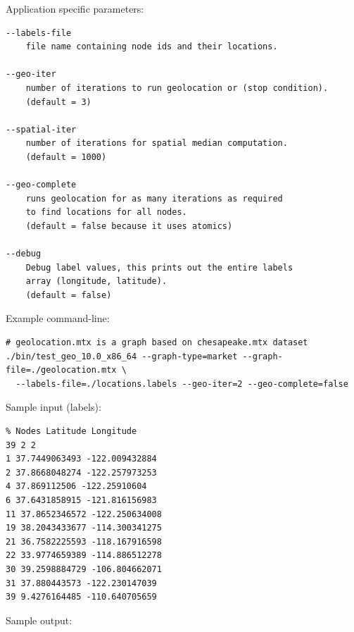 \documentclass[10pt,oneside]{memoir}
\begin{document}
Application specific parameters:

\begin{verbatim}
--labels-file
    file name containing node ids and their locations.

--geo-iter
    number of iterations to run geolocation or (stop condition).
    (default = 3)

--spatial-iter
    number of iterations for spatial median computation.
    (default = 1000)

--geo-complete
    runs geolocation for as many iterations as required
    to find locations for all nodes.
    (default = false because it uses atomics)

--debug
    Debug label values, this prints out the entire labels
    array (longitude, latitude).
    (default = false)
\end{verbatim}

Example command-line:

\begin{verbatim}
# geolocation.mtx is a graph based on chesapeake.mtx dataset
./bin/test_geo_10.0_x86_64 --graph-type=market --graph-file=./geolocation.mtx \
  --labels-file=./locations.labels --geo-iter=2 --geo-complete=false
\end{verbatim}

Sample input (labels):

\begin{verbatim}
% Nodes Latitude Longitude
39 2 2
1 37.7449063493 -122.009432884
2 37.8668048274 -122.257973253
4 37.869112506 -122.25910604
6 37.6431858915 -121.816156983
11 37.8652346572 -122.250634008
19 38.2043433677 -114.300341275
21 36.7582225593 -118.167916598
22 33.9774659389 -114.886512278
30 39.2598884729 -106.804662071
31 37.880443573 -122.230147039
39 9.4276164485 -110.640705659
\end{verbatim}

Sample output:
\end{document}

